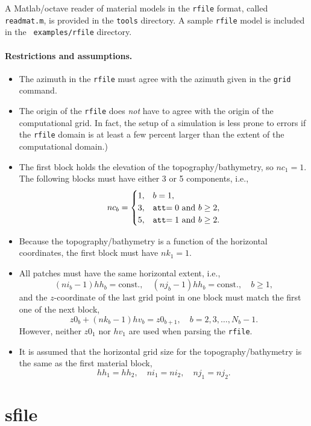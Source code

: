 \documentclass[11pt]{report}
\begin{document}
A Matlab/octave reader of material models in the {\tt rfile} format, called {\tt readmat.m}, is
provided in the {\tt tools} directory. A sample {\tt rfile} model is included in the {\tt
  examples/rfile} directory.

\paragraph{Restrictions and assumptions.}
\begin{itemize}
\item The azimuth in the {\tt rfile} must agree with the azimuth given in the {\tt grid} command.
\item The origin of the {\tt rfile} does {\em not} have to agree with the origin of the
  computational grid. In fact, the setup of a simulation is less prone to errors if the {\tt rfile}
  domain is at least a few percent larger than the extent of the computational domain.)

\item The first block holds the elevation of the topography/bathymetry, so $nc_1=1$. The following blocks
must have either 3 or 5 components, i.e.,
\[
nc_b=\begin{cases}
1,& b=1,\\
3,& \mbox{{\tt att}$=0$ and $b\geq 2$},\\
5,& \mbox{{\tt att}$=1$ and $b\geq 2$}.
\end{cases}
\]

\item Because the topography/bathymetry is a function of the horizontal coordinates, the first block must have
$nk_1=1$.

\item All patches must have the same horizontal extent, i.e.,
\[
(ni_b -1)hh_b = \mbox{const.},\quad (nj_b - 1)hh_b = \mbox{const.},\quad b\geq 1,
\]
and the $z$-coordinate of the last grid point in one block must match the first one of the next
block,
\[
z0_b+(nk_b-1)hv_b = z0_{b+1},\quad b=2,3,\ldots,N_b-1.
\]
However, neither $z0_1$ nor $hv_1$ are used when parsing the {\tt rfile}. 

\item It is assumed that the horizontal grid size for the topography/bathymetry is the same as the
  first material block,
\[
hh_1 = hh_2,\quad ni_1=ni_2,\quad nj_1=nj_2.
\]
\end{itemize}

\section{sfile}\label{sec:sfile-format}
\end{document}
